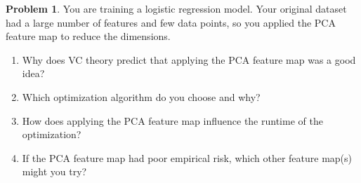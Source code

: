 \documentclass[10pt]{exam}
\theoremstyle{definition}
\newtheorem{problem}{Problem}
\begin{document}
\newpage
\begin{problem}
    You are training a logistic regression model.
    Your original dataset had a large number of features and few data points,
    so you applied the PCA feature map to reduce the dimensions.

    \begin{enumerate}
        \item
            Why does VC theory predict that applying the PCA feature map was a good idea?
            \vspace{2in}
        \item
            Which optimization algorithm do you choose and why?
            \vspace{2in}
        \item
            How does applying the PCA feature map influence the runtime of the optimization?
            \vspace{2in}
        \item
            If the PCA feature map had poor empirical risk, which other feature map(s) might you try?
    \end{enumerate}
\end{problem}
\end{document}
